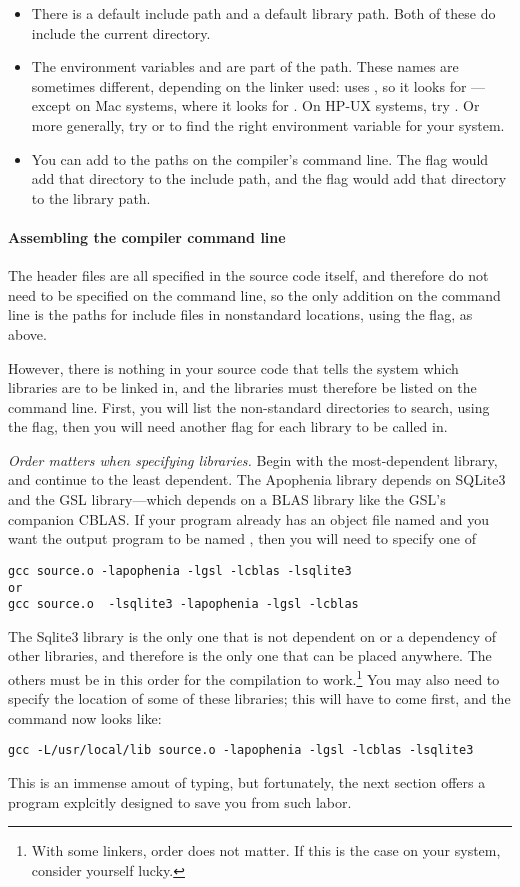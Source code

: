 \begin{itemize}
\item There is a default include path and a default library path. Both
of these do include the current directory.
\item The environment variables  and  are
part of the path. These names are sometimes different, depending on the linker
used:  uses , so it looks for
---except on Mac systems, where it looks for
. On HP-UX systems, try . Or more
generally, try  or  to find the right environment
variable for your system.
\item You can add to the paths on the compiler's command line. The flag
 would add that directory to the include path,
and the flag  would add that directory to the
library path. 
\end{itemize}

\paragraph{Assembling the compiler command line} The header files are
all specified in the source code itself, and therefore do not need to
be specified on the command line, so the only addition on the command
line is the paths for include files in nonstandard locations, using the
 flag, as above.

However, there is nothing in your source code that tells the system which
libraries are to be linked in, and the libraries must therefore be listed
on the command line. First, you will list the non-standard directories
to search, using the  flag, then you will need another flag for
each library to be called in.

{\em Order matters when specifying libraries.} Begin with the
most-dependent library, and continue to the least dependent.
The Apophenia library depends on SQLite3 and the GSL library---which
depends on a BLAS library like the GSL's companion CBLAS. If your
program already has an object file named  and you want the
output program to be named , then you will need to specify
one of 
\begin{lstlisting}
gcc source.o -lapophenia -lgsl -lcblas -lsqlite3
or
gcc source.o  -lsqlite3 -lapophenia -lgsl -lcblas
\end{lstlisting}
The Sqlite3 library is the only one that is not dependent on or a
dependency of other libraries, and therefore is the only one that can be
placed anywhere. The others must be in this order for the compilation to
work.\footnote{With some linkers, order does not matter. If this is the case on your system, consider yourself
lucky.} You may also need to specify the location of some of these
libraries; this will have to come first, and the command now looks like:
\begin{lstlisting}
gcc -L/usr/local/lib source.o -lapophenia -lgsl -lcblas -lsqlite3
\end{lstlisting}
This is an immense amout of typing, but fortunately, the next section
offers a
program explcitly designed to save you from such labor.

